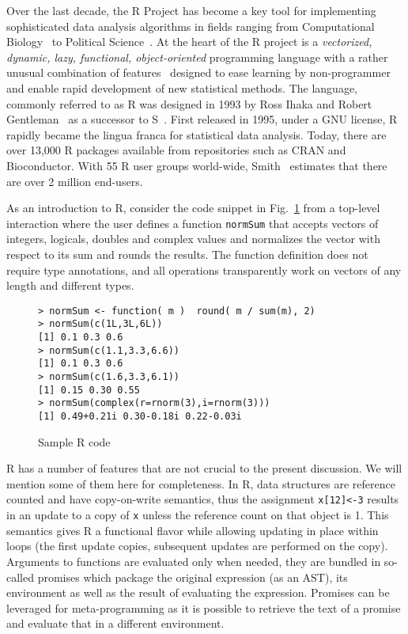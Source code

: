 \documentclass[acmsmall,10pt,review,anonymous]{acmart}\settopmatter{printfolios=true,printccs=false,printacmref=false}
\newcommand{\code}[1]{\lstinline|#1|\xspace}
\begin{document}
Over the last decade, the R Project has become a key tool for implementing
sophisticated data analysis algorithms in fields ranging from Computational
Biology~\cite{R05} to Political Science~\cite{R:Keele:2008}. At the heart of
the R project is a \emph{vectorized, dynamic, lazy, functional,
  object-oriented} programming language with a rather unusual combination of
features~\cite{ecoop12} designed to ease learning by non-programmer and
enable rapid development of new statistical methods.  The language, commonly
referred to as R was designed in 1993 by Ross Ihaka and Robert
Gentleman~\cite{R96} as a successor to S~\cite{S88}.  First released in
1995, under a GNU license, R rapidly became the lingua franca for
statistical data analysis. Today, there are over 13,000 R packages available
from repositories such as CRAN and Bioconductor.  With 55 R user groups
world-wide, Smith~\cite{eco11} estimates that there are over 2 million
end-users.

As an introduction to R, consider the code snippet in Fig.~\ref{sample} from
a top-level interaction where the user defines a function \code{normSum}
that accepts vectors of integers, logicals, doubles and complex values and
normalizes the vector with respect to its sum and rounds the results. The
function definition does not require type annotations, and all operations
transparently work on vectors of any length and different types.

\begin{figure}[!hb]{\small
\begin{lstlisting}[style=R]
> normSum <- function( m )  round( m / sum(m), 2)
> normSum(c(1L,3L,6L))
[1] 0.1 0.3 0.6
> normSum(c(1.1,3.3,6.6))
[1] 0.1 0.3 0.6
> normSum(c(1.6,3.3,6.1))
[1] 0.15 0.30 0.55
> normSum(complex(r=rnorm(3),i=rnorm(3)))
[1] 0.49+0.21i 0.30-0.18i 0.22-0.03i
\end{lstlisting}}
\caption{Sample R code}\label{sample}
\end{figure}

R has a number of features that are not crucial to the present
discussion. We will mention some of them here for completeness.  In R, data
structures are reference counted and have copy-on-write semantics, thus the
assignment \code{x[12]<-3} results in an update to a copy of \code{x} unless
the reference count on that object is 1.  This semantics gives R a
functional flavor while allowing updating in place within loops (the first
update copies, subsequent updates are performed on the copy). Arguments to
functions are evaluated only when needed, they are bundled in so-called
promises which package the original expression (as an AST), its environment
as well as the result of evaluating the expression. Promises can be
leveraged for meta-programming as it is possible to retrieve the text of a
promise and evaluate that in a different environment.
\end{document}
